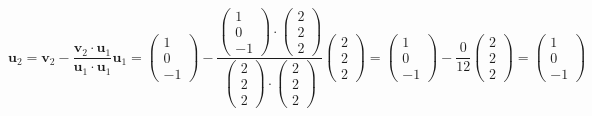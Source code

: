 \documentclass[a3paper,12pt]{extarticle} %
\begin{document}
\begin{enumerate}
\begin{enumerate}
\[        \]
        \[
            \mathbf{u}_2 = \mathbf{v}_2 - \frac{\mathbf{v}_2 \cdot \mathbf{u}_1}{\mathbf{u}_1 \cdot \mathbf{u}_1} \mathbf{u}_1 = \begin{pmatrix} 1 \\ 0 \\ -1 \end{pmatrix} - \frac{\begin{pmatrix} 1 \\ 0 \\ -1 \end{pmatrix} \cdot \begin{pmatrix} 2 \\ 2 \\ 2 \end{pmatrix}}{\begin{pmatrix} 2 \\ 2 \\ 2 \end{pmatrix} \cdot \begin{pmatrix} 2 \\ 2 \\ 2 \end{pmatrix}} \begin{pmatrix} 2 \\ 2 \\ 2 \end{pmatrix} = \begin{pmatrix} 1 \\ 0 \\ -1 \end{pmatrix} - \frac{0}{12} \begin{pmatrix} 2 \\ 2 \\ 2 \end{pmatrix} = \begin{pmatrix} 1 \\ 0 \\ -1 \end{pmatrix}
        \]
        \[
\]
\end{enumerate}
\end{enumerate}
\end{document}
